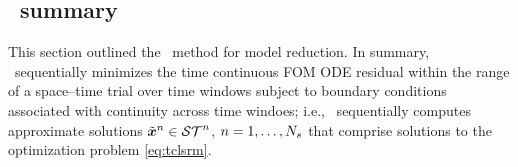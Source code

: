 



\subsection{\methodAcronym\ summary}
This section outlined the \methodAcronym\ method for model reduction. In
summary, \methodAcronym\ sequentially minimizes the time continuous FOM ODE
residual within the range of a space--time trial over time
windows subject to boundary conditions associated with continuity across time
windoes; i.e.,  
\methodAcronym\ sequentially computes approximate solutions
$\tilde{\boldsymbol x}^{n}\in\mathcal{ ST }^n$, $n=1,\ldots,N_s$ that comprise
solutions to the optimization problem \eqref{eq:tclsrm}.

